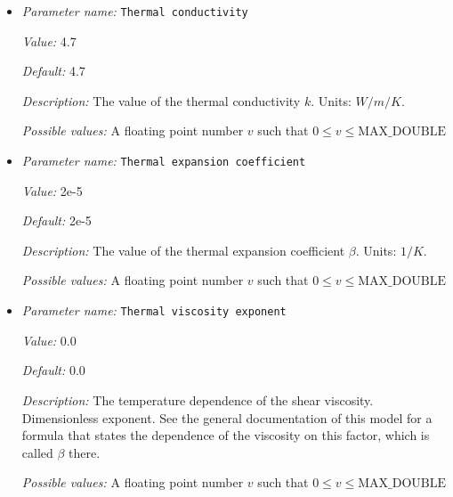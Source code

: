 \begin{itemize}
{\it Possible values:} A floating point number $v$ such that $0 \leq v \leq \text{MAX\_DOUBLE}$
\item {\it Parameter name:} {\tt Thermal conductivity}
\label{parameters:Material model/Melt global/Thermal conductivity}
\label{parameters:Material_20model/Melt_20global/Thermal_20conductivity}


{\it Value:} 4.7


{\it Default:} 4.7


{\it Description:} The value of the thermal conductivity $k$. Units: $W/m/K$.


{\it Possible values:} A floating point number $v$ such that $0 \leq v \leq \text{MAX\_DOUBLE}$
\item {\it Parameter name:} {\tt Thermal expansion coefficient}
\label{parameters:Material model/Melt global/Thermal expansion coefficient}
\label{parameters:Material_20model/Melt_20global/Thermal_20expansion_20coefficient}


{\it Value:} 2e-5


{\it Default:} 2e-5


{\it Description:} The value of the thermal expansion coefficient $\beta$. Units: $1/K$.


{\it Possible values:} A floating point number $v$ such that $0 \leq v \leq \text{MAX\_DOUBLE}$
\item {\it Parameter name:} {\tt Thermal viscosity exponent}
\label{parameters:Material model/Melt global/Thermal viscosity exponent}
\label{parameters:Material_20model/Melt_20global/Thermal_20viscosity_20exponent}


{\it Value:} 0.0


{\it Default:} 0.0


{\it Description:} The temperature dependence of the shear viscosity. Dimensionless exponent. See the general documentation of this model for a formula that states the dependence of the viscosity on this factor, which is called $\beta$ there.


{\it Possible values:} A floating point number $v$ such that $0 \leq v \leq \text{MAX\_DOUBLE}$
\end{itemize}

